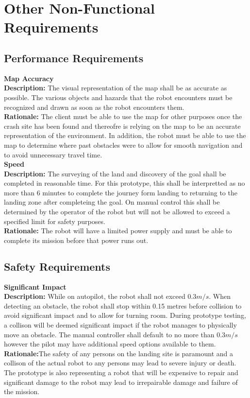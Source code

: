 \documentclass[10pt,a4paper,titlepage]{article}
\begin{document}
	\section{Other Non-Functional Requirements}
	\subsection{Performance Requirements}
		
		\textbf {Map Accuracy}\\
		\textbf {Description:} The visual representation of the map shall be as accurate as possible. The various objects and hazards that the robot encounters must be recognized and drawn as soon as the robot encounters them.\\
		\textbf {Rationale:} The client must be able to use the map for other purposes once the crash site has been found and thereofre is relying on the map to be an accurate representation of the environment. In addition, the robot must be able to use the map to determine where past obstacles were to allow for smooth navigation and to avoid unnecessary travel time.\\

		\textbf {Speed}\\
		\textbf {Description:} The surveying of the land and discovery of the goal shall be completed in reasonable time. For this prototype, this shall be interpretted as no more than 6 minutes to complete the journey form landing to returning to the landing zone after completeing the goal. On manual control this shall be determined by the operator of the robot but will not be allowed to exceed a specified limit for safety purposes.\\
		\textbf {Rationale:} The robot will have a limited power supply and must be able to complete its mission before that power runs out. \\
		
	\subsection{Safety Requirements}
		\textbf {Significant Impact}\\
		\textbf {Description:} While on autopilot, the robot shall not exceed \begin{math}0.3 m/s\end{math}. When detecting an obstacle, the robot shall stop within 0.15 metres before collision to avoid significant impact and to allow for turning room. During prototype testing, a collison will be deemed significant impact if the robot manages to physically move an obstacle. The manual controller shall default to no more than \begin{math}0.3 m/s\end{math} however the pilot may have additional speed options available to them.\\
		\textbf {Rationale:}The safety of any persons on the landing site is paramount and a collison of the actual robot to any persons may lead to severe injury or death. The prototype is also representing a robot that will be expensive to repair and significant damage to the robot may lead to irrepairable damage and failure of the mission.\\
\end{document}
